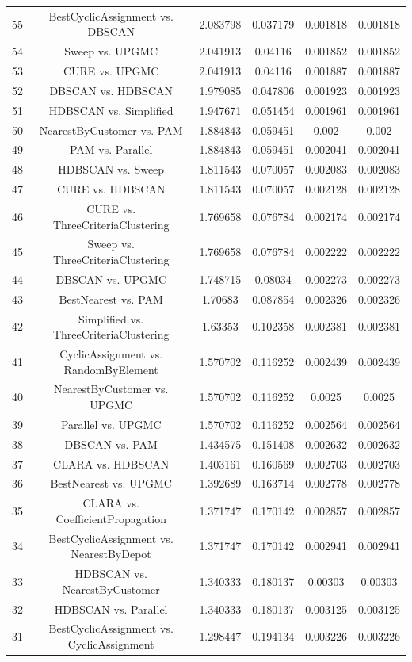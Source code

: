 \documentclass[a4paper,10pt]{article}
\begin{document}
\begin{landscape}
\begin{table}[!htp]
\begin{tabular}{cccccc}
55&BestCyclicAssignment vs. DBSCAN&2.083798&0.037179&0.001818&0.001818\\
54&Sweep vs. UPGMC&2.041913&0.04116&0.001852&0.001852\\
53&CURE vs. UPGMC&2.041913&0.04116&0.001887&0.001887\\
52&DBSCAN vs. HDBSCAN&1.979085&0.047806&0.001923&0.001923\\
51&HDBSCAN vs. Simplified&1.947671&0.051454&0.001961&0.001961\\
50&NearestByCustomer vs. PAM&1.884843&0.059451&0.002&0.002\\
49&PAM vs. Parallel&1.884843&0.059451&0.002041&0.002041\\
48&HDBSCAN vs. Sweep&1.811543&0.070057&0.002083&0.002083\\
47&CURE vs. HDBSCAN&1.811543&0.070057&0.002128&0.002128\\
46&CURE vs. ThreeCriteriaClustering&1.769658&0.076784&0.002174&0.002174\\
45&Sweep vs. ThreeCriteriaClustering&1.769658&0.076784&0.002222&0.002222\\
44&DBSCAN vs. UPGMC&1.748715&0.08034&0.002273&0.002273\\
43&BestNearest vs. PAM&1.70683&0.087854&0.002326&0.002326\\
42&Simplified vs. ThreeCriteriaClustering&1.63353&0.102358&0.002381&0.002381\\
41&CyclicAssignment vs. RandomByElement&1.570702&0.116252&0.002439&0.002439\\
40&NearestByCustomer vs. UPGMC&1.570702&0.116252&0.0025&0.0025\\
39&Parallel vs. UPGMC&1.570702&0.116252&0.002564&0.002564\\
38&DBSCAN vs. PAM&1.434575&0.151408&0.002632&0.002632\\
37&CLARA vs. HDBSCAN&1.403161&0.160569&0.002703&0.002703\\
36&BestNearest vs. UPGMC&1.392689&0.163714&0.002778&0.002778\\
35&CLARA vs. CoefficientPropagation&1.371747&0.170142&0.002857&0.002857\\
34&BestCyclicAssignment vs. NearestByDepot&1.371747&0.170142&0.002941&0.002941\\
33&HDBSCAN vs. NearestByCustomer&1.340333&0.180137&0.00303&0.00303\\
32&HDBSCAN vs. Parallel&1.340333&0.180137&0.003125&0.003125\\
31&BestCyclicAssignment vs. CyclicAssignment&1.298447&0.194134&0.003226&0.003226\\

\end{tabular}
\end{table}
\end{landscape}
\end{document}
